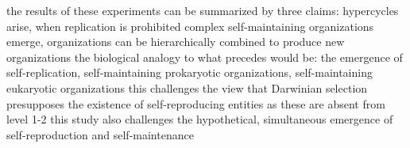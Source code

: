\markdownRendererUlItem the results of these experiments can be summarized by three claims: hypercycles arise, when replication is prohibited complex self-maintaining organizations emerge, organizations can be hierarchically combined to produce new organizations\markdownRendererUlItemEnd 
\markdownRendererUlItem the biological analogy to what precedes would be: the emergence of self-replication, self-maintaining prokaryotic organizations, self-maintaining eukaryotic organizations\markdownRendererUlItemEnd 
\markdownRendererUlItem this challenges the view that Darwinian selection presupposes the existence of self-reproducing entities as these are absent from level 1-2\markdownRendererUlItemEnd 
\markdownRendererUlItem this study also challenges the hypothetical, simultaneous emergence of self-reproduction and self-maintenance\markdownRendererUlItemEnd 
\markdownRendererUlEnd \markdownRendererDocumentEnd